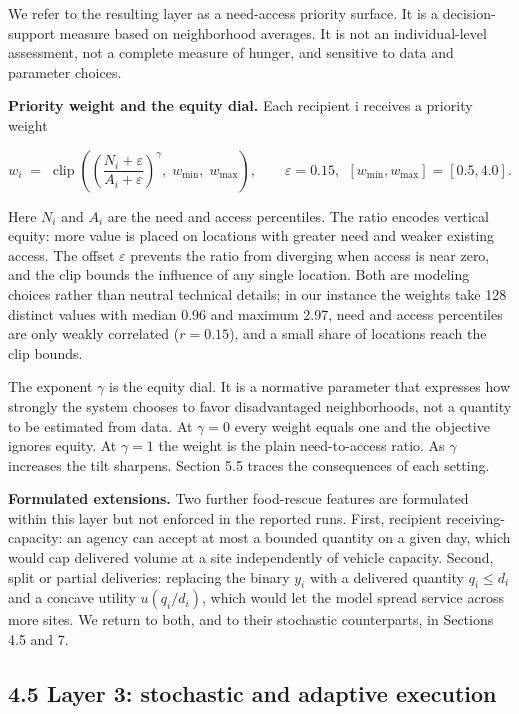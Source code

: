 \documentclass[
  11pt,
]{article}
\begin{document}
We refer to the resulting layer as a need-access priority surface. It is
a decision-support measure based on neighborhood averages. It is not an
individual-level assessment, not a complete measure of hunger, and
sensitive to data and parameter choices.

\textbf{Priority weight and the equity dial.} Each recipient i receives
a priority weight

\[ w_i \;=\; \operatorname{clip}\!\left(\left(\frac{N_i + \varepsilon}{A_i + \varepsilon}\right)^{\gamma},\; w_{\min},\; w_{\max}\right), \qquad \varepsilon = 0.15,\ \ [w_{\min}, w_{\max}] = [0.5, 4.0]. \]

Here \(N_i\) and \(A_i\) are the need and access percentiles. The ratio
encodes vertical equity: more value is placed on locations with greater
need and weaker existing access. The offset \(\varepsilon\) prevents the
ratio from diverging when access is near zero, and the clip bounds the
influence of any single location. Both are modeling choices rather than
neutral technical details; in our instance the weights take 128 distinct
values with median 0.96 and maximum 2.97, need and access percentiles
are only weakly correlated (\(r = 0.15\)), and a small share of
locations reach the clip bounds.

The exponent \(\gamma\) is the equity dial. It is a normative parameter
that expresses how strongly the system chooses to favor disadvantaged
neighborhoods, not a quantity to be estimated from data. At
\(\gamma = 0\) every weight equals one and the objective ignores equity.
At \(\gamma = 1\) the weight is the plain need-to-access ratio. As
\(\gamma\) increases the tilt sharpens. Section 5.5 traces the
consequences of each setting.

\textbf{Formulated extensions.} Two further food-rescue features are
formulated within this layer but not enforced in the reported runs.
First, recipient receiving-capacity: an agency can accept at most a
bounded quantity on a given day, which would cap delivered volume at a
site independently of vehicle capacity. Second, split or partial
deliveries: replacing the binary \(y_i\) with a delivered quantity
\(q_i \le d_i\) and a concave utility \(u(q_i / d_i)\), which would let
the model spread service across more sites. We return to both, and to
their stochastic counterparts, in Sections 4.5 and 7.

\subsection{4.5 Layer 3: stochastic and adaptive
execution}\label{layer-3-stochastic-and-adaptive-execution}
\end{document}

